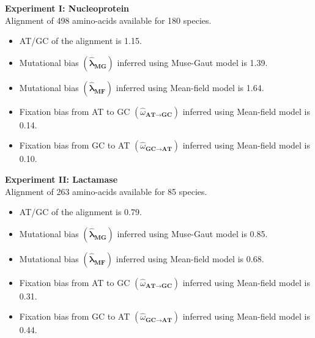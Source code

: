 \documentclass[8pt]{beamer}
\begin{document}
	\begin{frame}
	\textbf{Experiment I: Nucleoprotein}\\
	Alignment of 498 amino-acids available for 180 species.
	\begin{itemize}
		\item AT/GC of the alignment is 1.15.
		\item Mutational bias $\left(\bm{\widehat{\lambda}_{\text{MG}}} \right)$ inferred using Muse-Gaut model is 1.39.
		\item Mutational bias $\left(\bm{\widehat{\lambda}_{\text{MF}}} \right)$ inferred using Mean-field model is 1.64.
		\item Fixation bias from AT to GC $\left(\widehat{\omega}_{\textbf{AT} \rightarrow \textbf{GC}}\right)$ inferred using Mean-field model is 0.14.
		\item Fixation bias from GC to AT $\left(\widehat{\omega}_{\textbf{GC} \rightarrow \textbf{AT}}\right)$ inferred using Mean-field model is 0.10.
	\end{itemize}
	\vspace{0.3cm}
	\textbf{Experiment II: Lactamase}\\
	Alignment of 263 amino-acids available for 85 species.
	\begin{itemize}
		\item AT/GC of the alignment is 0.79.
		\item Mutational bias $\left(\bm{\widehat{\lambda}_{\text{MG}}} \right)$ inferred using Muse-Gaut model is 0.85.
		\item Mutational bias $\left(\bm{\widehat{\lambda}_{\text{MF}}} \right)$ inferred using Mean-field model is 0.68.
		\item Fixation bias from AT to GC $\left(\widehat{\omega}_{\textbf{AT} \rightarrow \textbf{GC}}\right)$ inferred using Mean-field model is 0.31.
		\item Fixation bias from GC to AT $\left(\widehat{\omega}_{\textbf{GC} \rightarrow \textbf{AT}}\right)$ inferred using Mean-field model is 0.44.
	\end{itemize}
\end{frame}
\end{document}
